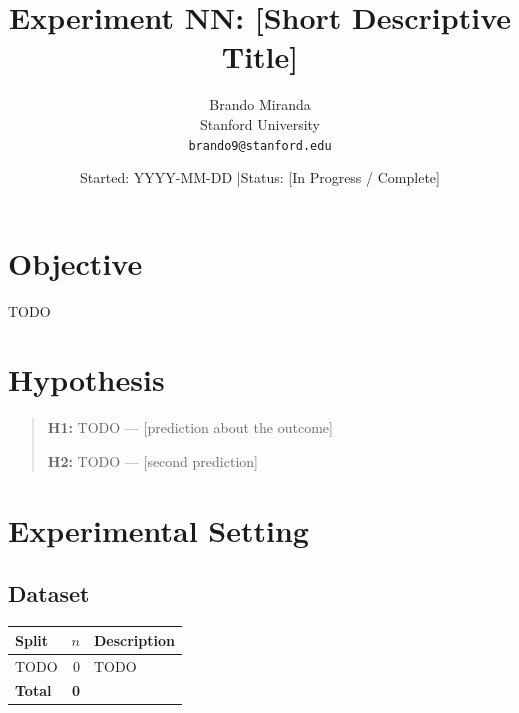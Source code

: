 \documentclass[11pt]{article}
\title{Experiment NN: [Short Descriptive Title]}
\author{Brando Miranda \\ Stanford University \\ \texttt{brando9@stanford.edu}}
\date{Started: YYYY-MM-DD \quad|\quad Status: [In Progress / Complete]}
\begin{document}
\maketitle

\section{Objective}
\label{sec:objective}


TODO

\section{Hypothesis}
\label{sec:hypothesis}


\begin{quote}
\textbf{H1:} TODO --- [prediction about the outcome]

\textbf{H2:} TODO --- [second prediction]
\end{quote}

\section{Experimental Setting}
\label{sec:setting}

\subsection{Dataset}


\begin{center}
\begin{tabular}{lrl}
\toprule
Split & $n$ & Description \\
\midrule
TODO & 0 & TODO \\
\midrule
\textbf{Total} & \textbf{0} & \\
\bottomrule
\end{tabular}
\end{center}
\end{document}

